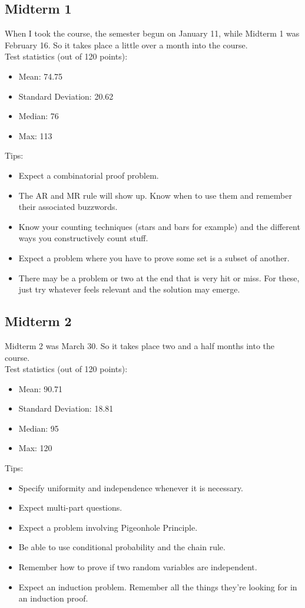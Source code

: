 \documentclass[11pt]{scrartcl}
\begin{document}
\subsection{Midterm 1}

When I took the course, the semester begun on January 11, while Midterm 1 was February 16. So it takes place a little over a month into the course. \\

\noindent
Test statistics (out of 120 points):
\begin{itemize}
    \item Mean: 74.75
    \item Standard Deviation: 20.62
    \item Median: 76
    \item Max: 113
\end{itemize}
\noindent
Tips:
\begin{itemize}
    \item Expect a combinatorial proof problem.
    \item The AR and MR rule will show up. Know when to use them and remember their associated buzzwords.
    \item Know your counting techniques (stars and bars for example) and the different ways you constructively count stuff.
    \item Expect a problem where you have to prove some set is a subset of another.
    \item There may be a problem or two at the end that is very hit or miss. For these, just try whatever feels relevant and the solution may emerge.
\end{itemize}

\subsection{Midterm 2}

Midterm 2 was March 30. So it takes place two and a half months into the course. \\

\noindent
Test statistics (out of 120 points):
\begin{itemize}
    \item Mean: 90.71
    \item Standard Deviation: 18.81
    \item Median: 95
    \item Max: 120
\end{itemize}
\noindent
Tips:
\begin{itemize}
    \item Specify uniformity and independence whenever it is necessary.
    \item Expect multi-part questions.
    \item Expect a problem involving Pigeonhole Principle.
    \item Be able to use conditional probability and the chain rule.
    \item Remember how to prove if two random variables are independent.
    \item Expect an induction problem. Remember all the things they're looking for in an induction proof.
\end{itemize}
\end{document}
